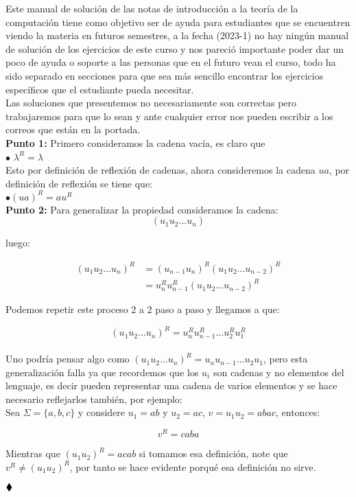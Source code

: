 Este manual de solución de las notas de introducción a la teoría de la computación tiene como objetivo ser de ayuda para estudiantes que se encuentren viendo la materia en futuros semestres, a la fecha (2023-1) no hay ningún manual de solución de los ejercicios de este curso y nos pareció importante poder dar un poco de ayuda o soporte a las personas que en el futuro vean el curso, todo ha sido separado en secciones para que sea más sencillo encontrar los ejercicios específicos que el estudiante pueda necesitar.\\

Las soluciones que presentemos no necesariamente son correctas pero trabajaremos para que lo sean y ante cualquier error nos pueden escribir a los correos que están en la portada.\\


\textbf{Punto 1:} Primero consideramos la cadena vacía, es claro que \\

\quad $\bullet$ $\lambda^R=\lambda$\\

Esto por definición de reflexión de cadenas, ahora consideremos la cadena $ua$, por definición de reflexión se tiene que:\\

\quad $\bullet (ua)^R=au^R$\\

\textbf{Punto 2:} Para generalizar la propiedad consideramos la cadena:\\

$$(u_1u_2...u_n)$$

luego:

\begin{align*}
(u_1u_2...u_n)^R&=(u_{n-1}u_n)^R(u_1u_2...u_{n-2})^R\\
&=u_n^Ru_{n-1}^R(u_1u_2...u_{n-2})^R
\end{align*}


Podemos repetir este proceso 2 a 2 paso a paso y llegamos a que:

$$(u_1u_2...u_n)^R=u_n^Ru_{n-1}^R...u_2^Ru_1^R$$\\

Uno podría pensar algo como $(u_1u_2...u_n)^R=u_nu_{n-1}...u_2u_1$, pero esta generalización falla ya que recordemos que los $u_i$ son cadenas y no elementos del lenguaje, es decir pueden representar una cadena de varios elementos y se hace necesario reflejarlos también, por ejemplo:\\

Sea $\Sigma=\{a,b,c\}$ y considere $u_1=ab$ y $u_2=ac$, $v=u_1u_2=abac$, entonces:

$$v^R=caba$$

Mientras que $(u_1u_2)^R=acab$ si tomamos esa definición, note que $v^R\neq (u_1u_2)^R$, por tanto se hace evidente porqué esa definición no sirve.

$\hfill \blacklozenge$


